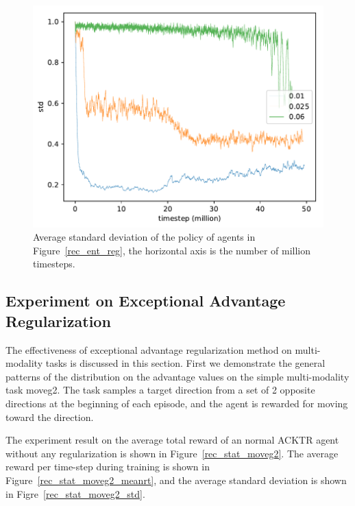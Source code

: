\begin{figure}[!htbp]
	\includegraphics[width=\textwidth]{images/rec_180609_std_ent_reg.pdf}
	\centering
	\caption{Average standard deviation of the policy of agents in Figure~\ref{rec_ent_reg}, the horizontal axis is the number of million timesteps.}\label{rec_std_ent_reg}
\end{figure}

\subsection{Experiment on Exceptional Advantage Regularization}
The effectiveness of exceptional advantage regularization method on multi-modality tasks is discussed in this section.
First we demonstrate the general patterns of the distribution on the advantage values on the simple multi-modality task moveg2. The task samples a target direction from a set of 2 opposite directions at the beginning of each episode, and the agent is rewarded for moving toward the direction.

The experiment result on the average total reward of an normal ACKTR agent without any regularization is shown in Figure~\ref{rec_stat_moveg2}. The average reward per time-step during training is shown in Figure~\ref{rec_stat_moveg2_meanrt}, and the average standard deviation is shown in Figre~\ref{rec_stat_moveg2_std}.


